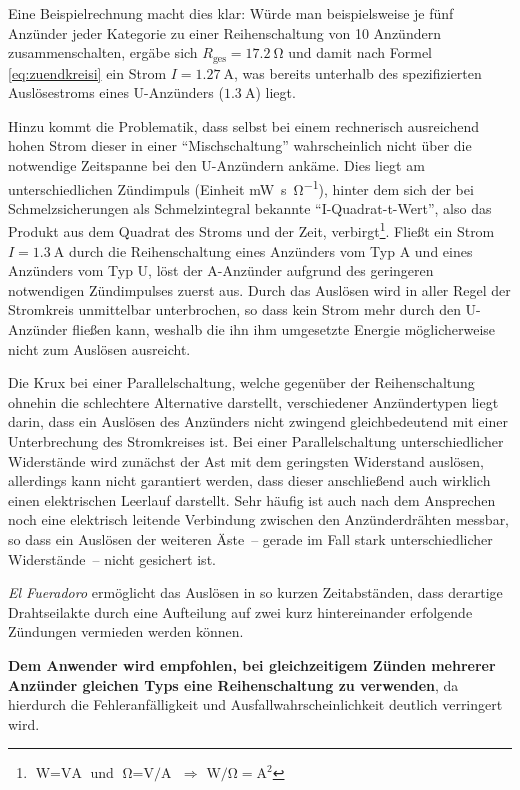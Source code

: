 \documentclass[paper=a4, parskip, numbers=noenddot, toc=listof, headsepline]{scrbook}
\newcommand{\anlage}{\emph{El Fueradoro}}
\begin{document}
				Eine Beispielrechnung macht dies klar: Würde man beispielsweise je fünf Anzünder jeder Kategorie zu einer Reihenschaltung von 10 Anzündern zusammenschalten, ergäbe sich $R_\text{ges} = \SI{17,2}{\ohm}$ und damit nach Formel \eqref{eq:zuendkreisi} ein Strom $I = \SI{1,27}{\ampere}$, was bereits unterhalb des spezifizierten Auslösestroms eines U-Anzünders ($\SI{1,3}{\ampere}$) liegt.

				Hinzu kommt die Problematik, dass selbst bei einem rechnerisch ausreichend hohen Strom dieser in einer \enquote{Mischschaltung} wahrscheinlich nicht über die notwendige Zeitspanne bei den U-Anzündern ankäme. Dies liegt am unterschiedlichen Zündimpuls (Einheit \si{\milli\watt\second\per\ohm}), hinter dem sich der bei Schmelzsicherungen als Schmelzintegral bekannte \enquote{I-Quadrat-t-Wert}, also das Produkt aus dem Quadrat des Stroms und der Zeit, verbirgt\footnote{$\si{\watt} = \si{\volt\ampere}$ und $\si{\ohm} = \si{\volt\per\ampere}$ $\Rightarrow$ $\si{\watt\per\ohm} = \si{\square\ampere}$}. Fließt ein Strom $I = \SI{1,3}{\ampere}$ durch die Reihenschaltung eines Anzünders vom Typ A und eines Anzünders vom Typ U, löst der A-Anzünder aufgrund des geringeren notwendigen Zündimpulses zuerst aus. Durch das Auslösen wird in aller Regel der Stromkreis unmittelbar unterbrochen, so dass kein Strom mehr durch den U-Anzünder fließen kann, weshalb die ihn ihm umgesetzte Energie möglicherweise nicht zum Auslösen ausreicht.

				Die Krux bei einer Parallelschaltung, welche gegenüber der Reihenschaltung ohnehin die schlechtere Alternative darstellt, verschiedener Anzündertypen liegt darin, dass ein Auslösen des Anzünders nicht zwingend gleichbedeutend mit einer Unterbrechung des Stromkreises ist. Bei einer Parallelschaltung unterschiedlicher Widerstände wird zunächst der Ast mit dem geringsten Widerstand auslösen, allerdings kann nicht garantiert werden, dass dieser anschließend auch wirklich einen elektrischen Leerlauf darstellt. Sehr häufig ist auch nach dem Ansprechen noch eine elektrisch leitende Verbindung zwischen den Anzünderdrähten messbar, so dass ein Auslösen der weiteren Äste~-- gerade im Fall stark unterschiedlicher Widerstände~-- nicht gesichert ist.

					{\anlage} ermöglicht das Auslösen in so kurzen Zeitabständen, dass derartige Drahtseilakte durch eine Aufteilung auf zwei kurz hintereinander erfolgende Zündungen vermieden werden können.

				\textbf{Dem Anwender wird empfohlen, bei gleichzeitigem Zünden mehrerer Anzünder gleichen Typs eine Reihenschaltung zu verwenden}, da hierdurch die Fehleranfälligkeit und Ausfallwahrscheinlichkeit deutlich verringert wird.
\end{document}
